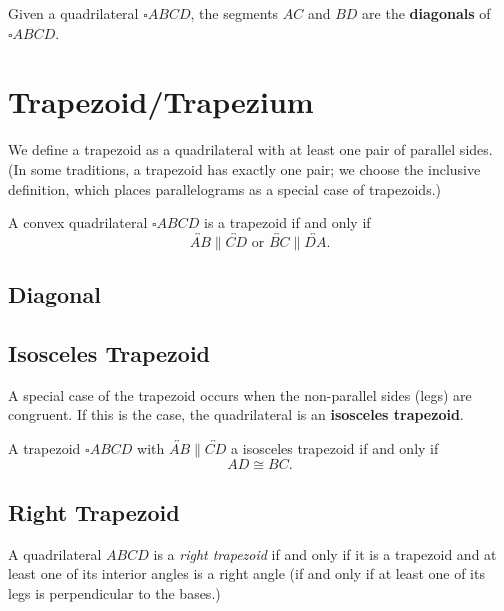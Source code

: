 \documentclass[../../../main/main.tex]{subfiles}
\begin{document}
\begin{definition}
    Given a quadrilateral $\square ABCD$, the segments $AC$ and $BD$ are the \textbf{diagonals} of $\square ABCD$.
\end{definition}

\section{Trapezoid/Trapezium}

We define a trapezoid as a quadrilateral with at least one pair of parallel sides. (In some traditions, a trapezoid has exactly one pair; we choose the inclusive definition, which places parallelograms as a special case of trapezoids.)

\begin{definition}
    A convex quadrilateral $\square ABCD$ is a trapezoid if and only if
    \[
    \overleftrightarrow{AB} \parallel \overleftrightarrow{CD} \text{ or } \overleftrightarrow{BC} \parallel \overleftrightarrow{DA}.
    \]
\end{definition}

\subsection{Diagonal}

\subsection{Isosceles Trapezoid}

A special case of the trapezoid occurs when the non-parallel sides (legs) are congruent. If this is the case, the quadrilateral is an \textbf{isosceles trapezoid}.

\begin{definition}
    A trapezoid $\square ABCD$ with $\overleftrightarrow{AB} \parallel \overleftrightarrow{CD}$ a isosceles trapezoid if and only if
    \[
    AD \cong BC.
    \]
\end{definition}

\subsection{Right Trapezoid}
\begin{definition}
    A quadrilateral $ABCD$ is a \emph{right trapezoid} if and only if it is a trapezoid and at least one of its interior angles is a right angle (if and only if at least one of its legs is perpendicular to the bases.)
\end{definition}
\end{document}
